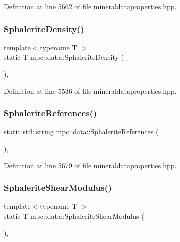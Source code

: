 Definition at line 5662 of file mineraldataproperties.\+hpp.

\mbox{\label{namespacempc_1_1data_a1549b2386c42d4873d68823cdc9772f6}} 
\subsubsection{\texorpdfstring{Sphalerite\+Density()}{SphaleriteDensity()}}
{\footnotesize\ttfamily template$<$typename T $>$ \\
static T mpc\+::data\+::\+Sphalerite\+Density (\begin{DoxyParamCaption}{ }\end{DoxyParamCaption})\hspace{0.3cm}{\ttfamily [inline]}, {\ttfamily [static]}}



Definition at line 5536 of file mineraldataproperties.\+hpp.

\mbox{\label{namespacempc_1_1data_aa37093379d94404e4a43b7b9a1643e95}} 
\subsubsection{\texorpdfstring{Sphalerite\+References()}{SphaleriteReferences()}}
{\footnotesize\ttfamily static std\+::string mpc\+::data\+::\+Sphalerite\+References (\begin{DoxyParamCaption}{ }\end{DoxyParamCaption})\hspace{0.3cm}{\ttfamily [inline]}, {\ttfamily [static]}}



Definition at line 5679 of file mineraldataproperties.\+hpp.

\mbox{\label{namespacempc_1_1data_a89e59f46d585e1438ba6504b945e1171}} 
\subsubsection{\texorpdfstring{Sphalerite\+Shear\+Modulus()}{SphaleriteShearModulus()}}
{\footnotesize\ttfamily template$<$typename T $>$ \\
static T mpc\+::data\+::\+Sphalerite\+Shear\+Modulus (\begin{DoxyParamCaption}{ }\end{DoxyParamCaption})\hspace{0.3cm}{\ttfamily [inline]}, {\ttfamily [static]}}



